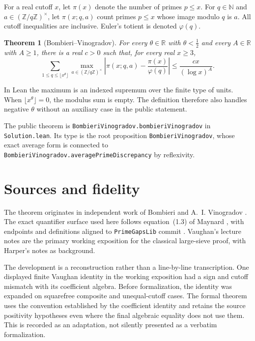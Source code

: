 \documentclass[11pt]{amsart}
\newcommand{\leanname}[1]{\nolinkurl{#1}}
\newtheorem{theorem}{Theorem}[section]
\theoremstyle{definition}
\theoremstyle{remark}
\begin{document}
For a real cutoff $x$, let $\pi(x)$ denote the number of primes $p\leq x$.
For $q\in\mathbb N$ and $a\in(\mathbb Z/q\mathbb Z)^\times$, let
$\pi(x;q,a)$ count primes $p\leq x$ whose image modulo $q$ is $a$.
All cutoff inequalities are inclusive. Euler's totient is denoted
$\varphi(q)$.

\begin{theorem}[Bombieri--Vinogradov]\label{thm:bv}
For every $\theta\in\mathbb R$ with $\theta<\tfrac12$ and every
$A\in\mathbb R$ with $A\geq1$, there is a real $c>0$ such that, for every
real $x\geq3$,
\[
  \sum_{1\leq q\leq\lfloor x^\theta\rfloor}
  \max_{a\in(\mathbb Z/q\mathbb Z)^\times}
  \left|\pi(x;q,a)-\frac{\pi(x)}{\varphi(q)}\right|
  \leq \frac{c x}{(\log x)^A}.
\]
\end{theorem}

In Lean the maximum is an indexed supremum over the finite type of units.
When $\lfloor x^\theta\rfloor=0$, the modulus sum is empty. The definition
therefore also handles negative $\theta$ without an auxiliary case in the
public statement.

The public theorem is
\leanname{BombieriVinogradov.bombieriVinogradov} in
\texttt{Solution.lean}. Its type is the root proposition
\texttt{BombieriVinogradov}, whose exact average form is connected to
\leanname{BombieriVinogradov.averagePrimeDiscrepancy} by reflexivity.

\section{Sources and fidelity}

The theorem originates in independent work of Bombieri \cite{Bombieri1965}
and A.~I. Vinogradov \cite{Vinogradov1965}. The exact quantifier surface used
here follows equation~(1.3) of Maynard \cite{Maynard2015}, with endpoints and
definitions aligned to \texttt{PrimeGapsLib} commit
. Vaughan's lecture notes
\cite{Vaughan2025} are the primary working exposition for the classical
large-sieve proof, with Harper's notes \cite{Harper2015} as background.

The development is a reconstruction rather than a line-by-line transcription.
One displayed finite Vaughan identity in the working exposition had a sign
and cutoff mismatch with its coefficient algebra. Before formalization, the
identity was expanded on squarefree composite and unequal-cutoff cases. The
formal theorem uses the convention established by the coefficient identity
and retains the source positivity hypotheses even where the final algebraic
equality does not use them. This is recorded as an adaptation, not silently
presented as a verbatim formalization.
\end{document}
